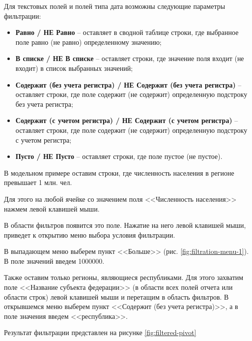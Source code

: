 \documentclass[../user-manual.tex]{subfiles}
\begin{document}
	Для текстовых полей и полей типа дата возможны следующие параметры фильтрации:
	
	\begin{itemize}
		
		\item \textbf{Равно / НЕ Равно} -- оставляет в сводной таблице строки, где выбранное поле равно (не равно) определенному значению;
		
		\item \textbf{В списке / НЕ В списке} -- оставляет строки, где значение поля входит (не входит) в список выбранных значений;
		
		\item \textbf{Содержит (без учета регистра) / НЕ Содержит (без учета регистра)} -- оставляет строки, где поле содержит (не содержит) определенную подстроку без учета регистра;
		
		\item \textbf{Содержит (с учетом регистра) / НЕ Содержит (с учетом регистра)} -- оставляет строки, где поле содержит (не содержит) определенную подстроку с учетом регистра;
		
		\item \textbf{Пусто / НЕ Пусто} -- оставляет строки, где поле пустое (не пустое).
		
	\end{itemize}

	\begin{modelExample}
		В модельном примере оставим строки, где численность населения в регионе превышает 1 млн. чел.
	
		Для этого на любой ячейке со значением поля <<Численность населения>> нажмем левой клавишей мыши.
	
		В области фильтров появится это поле. Нажатие на него левой клавишей мыши, приведет к открытию меню выбора условия фильтрации.
	
		В выпадающем меню выберем пункт <<Больше>> (рис. \ref{fig:filtration-menu-1}). В поле значений введем 1000000.
	
		Также оставим только регионы, являющиеся республиками. Для этого захватим поле <<Название субъекта федерации>> (в области всех полей отчета или области строк) левой клавишей мыши и перетащим в область фильтров. В открывшемся меню выберем пункт <<Содержит (без учета регистра)>>, а в поле значения введем <<республика>>.

		Результат фильтрации представлен на рисунке \ref{fig:filtered-pivot}
	\end{modelExample}
\end{document}
